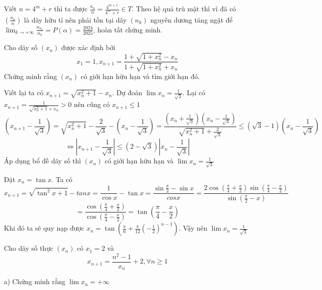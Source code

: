 \documentclass[11pt]{scrartcl}
\begin{document}
\begin{itemize}[label=, leftmargin=0em, itemsep=0.5em]
\begin{sol}
        
        
        Viết $n = 4^m + r$ thì ta được $\frac{a_n}{n} = \frac{4^{m + 1}}{4^m + r} \in T$. Theo hệ quả trù mật thì vì đã có $\left(\frac{a_n}{n}\right)$ là dãy hữu tỉ nên phải tồn tại dãy $(n_k)$ nguyên dương tăng ngặt để $\displaystyle \lim_{k \to +\infty}\frac{a_{n_k}}{n_k} = P(\alpha) = \frac{2024}{2025}$, hoàn tất chứng minh.
    \end{sol}
    \begin{bt}
        Cho dãy số $(x_n)$ được xác định bởi $$x_1 = 1, x_{n + 1} = \frac{1 + \sqrt{1 + x_n^2} - x_n}{1 + \sqrt{ 1 + x_n^2} + x_n}$$Chứng minh rằng $(x_n)$ có giới hạn hữu hạn và tìm giới hạn đó.
    \end{bt}

    \begin{sol}
         Viết lại ta có $x_{n + 1} = \sqrt{x_n^2 + 1} - x_n$. Dự đoán $\lim x_n = \frac{1}{\sqrt{3}}$. Lại có 
        $x_{n + 1} = \frac{1}{\sqrt{x_n^2 + 1} + x_n} > 0$ nên cũng có $x_{n+ 1} \leq 1$
        \[(x_{n + 1} - \frac{1}{\sqrt{3}}) = \sqrt{x_n^2 + 1} - \frac{2}{\sqrt{3}} - (x_n - \frac{1}{\sqrt{3}}) = \frac{(x_n + \frac{1}{\sqrt{3}})(x_n - \frac{1}{\sqrt{3}})}{\sqrt{x_n^2 + 1} + \frac{2}{\sqrt{3}}} \leq (\sqrt{3} - 1)(x_n - \frac{1}{\sqrt{3}})
        \]
        \[\Leftrightarrow |x_{n + 1} - \frac{1}{\sqrt{3}}| \leq (2 - \sqrt{3})|x_n - \frac{1}{\sqrt{3}}|\]
        Áp dụng bổ đề dãy số thì $(x_n)$ có giới hạn hữu hạn và $\lim x_n = \frac{1}{\sqrt{3}}$ 


         Đặt $x_n = \tan{x}$. Ta có 
        \[x_{ n + 1} = \sqrt{\tan^2{x} + 1} - tan{x} = \frac{1}{\cos x} - \tan{x} = \frac{\sin{\frac{\pi}{2}} - \sin{x}}{cos{x}} = \frac{2\cos(\frac{\pi}{4} + \frac{x}{2})\sin(\frac{\pi}{4} -\frac{x}{2})}{\sin(\frac{\pi}{2} - x)}\]
        \[
        = \frac{\cos(\frac{\pi}{4} + \frac{x}{2})}{\cos(\frac{\pi}{4} - \frac{x}{2})} = \tan(\frac{\pi}{4} - \frac{x}{2})
        \]
        Khi đó ta sẽ quy nạp được $x_n = \tan\left(\frac{\pi}{6} + \frac{\pi}{12}\left(-\frac{1}{2}\right)^{n - 1}\right)$. Vậy nên $\lim x_n = \frac{1}{\sqrt{3}}$
    \end{sol}
    
    \begin{bt}
        Cho dãy số thực $(x_n)$ có $x_1 = 2$ và
        \[x_{n + 1} = \frac{n^2- 1}{x_n} + 2, \forall n \geq 1\]


        a) Chứng minh rằng $\lim x_n = +\infty$



\end{bt}
\end{itemize}
\end{document}
